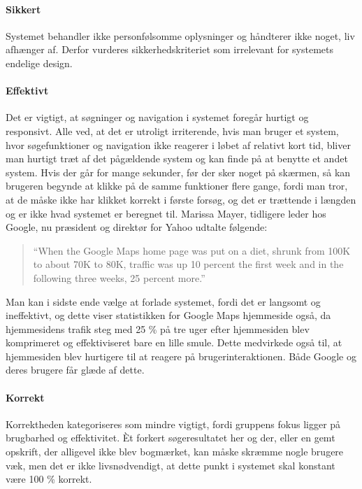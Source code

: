 \paragraph{Sikkert} Systemet behandler ikke personfølsomme oplysninger og håndterer ikke noget, liv afhænger af. Derfor vurderes sikkerhedskriteriet som irrelevant for systemets endelige design.

\paragraph{Effektivt} Det er vigtigt, at søgninger og navigation i systemet foregår hurtigt og responsivt. Alle ved, at det er utroligt irriterende, hvis man bruger et system, hvor søgefunktioner og navigation ikke reagerer i løbet af relativt kort tid, bliver man hurtigt træt af det pågældende system og kan finde på at benytte et andet system. Hvis der går for mange sekunder, før der sker noget på skærmen, så kan brugeren begynde at klikke på de samme funktioner flere gange, fordi man tror, at de måske ikke har klikket korrekt i første forsøg, og det er trættende i længden og er ikke hvad systemet er beregnet til. Marissa Mayer, tidligere leder hos Google, nu præsident og direktør for Yahoo udtalte følgende: \cite{googlespeed}
\begin{quote}
``When the Google Maps home page was put on a diet, shrunk from 100K to about 70K to 80K, traffic was up 10 percent the first week and in the following three weeks, 25 percent more.''
\end{quote}  

Man kan i sidste ende vælge at forlade systemet, fordi det er langsomt og ineffektivt, og dette viser statistikken for Google Maps hjemmeside også, da hjemmesidens trafik steg med 25 \% på tre uger efter hjemmesiden blev komprimeret og effektiviseret bare en lille smule. Dette medvirkede også til, at hjemmesiden blev hurtigere til at reagere på brugerinteraktionen. Både Google og deres brugere får glæde af dette.

\paragraph{Korrekt} Korrektheden kategoriseres som mindre vigtigt, fordi gruppens fokus ligger på brugbarhed og effektivitet. Èt forkert søgeresultatet her og der, eller en gemt opskrift, der alligevel ikke blev bogmærket, kan måske skræmme nogle brugere væk, men det er ikke livsnødvendigt, at dette punkt i systemet skal konstant være 100 \% korrekt.

